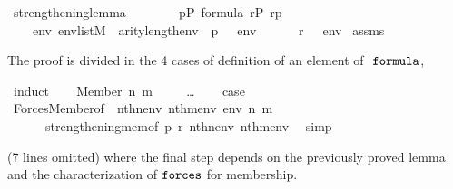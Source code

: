 \begin{isabelle}
\isamarkupfalse%
\ strengthening{\isacharunderscore}lemma{\isacharcolon}\isanewline
\ \ \ \isanewline
\ \ \ \ {\isachardoublequoteopen}p{\isasymin}P{\isachardoublequoteclose}\ {\isachardoublequoteopen}{\isasymphi}{\isasymin}formula{\isachardoublequoteclose}\ {\isachardoublequoteopen}r{\isasymin}P{\isachardoublequoteclose}\ {\isachardoublequoteopen}r{\isasympreceq}p{\isachardoublequoteclose}\isanewline
\ \ \isanewline
\ \ \ \ {\isachardoublequoteopen}{\isasymAnd}env{\isachardot}\ env{\isasymin}list{\isacharparenleft}M{\isacharparenright}\ {\isasymLongrightarrow}\ arity{\isacharparenleft}{\isasymphi}{\isacharparenright}{\isasymle}length{\isacharparenleft}env{\isacharparenright}\ {\isasymLongrightarrow}\ p\ {\isasymtturnstile}\ {\isasymphi}\ env\isanewline 
\ \ \ \ \ {\isasymLongrightarrow}\ r\ {\isasymtturnstile}\ {\isasymphi}\ env{\isachardoublequoteclose}\isanewline
%
%
\isamarkupfalse%
\ assms{\isacharparenleft}{}{\isacharparenright}
\end{isabelle}
%
The proof is divided in the 4 cases of definition of an element of $\formula$,
%
\begin{isabelle}
\isamarkupfalse%
\ {\isacharparenleft}induct{\isacharparenright}\isanewline
\ \ \isamarkupfalse%
\ {\isacharparenleft}Member\ n\ m{\isacharparenright}\isanewline
\ \ \isamarkupfalse%
\isanewline
\ \ \dots
\isanewline
\ \ \isamarkupfalse%
\ {\isacharquery}case\ \isanewline
\ \ \ \ \isamarkupfalse%
\ Forces{\isacharunderscore}Member{\isacharbrackleft}of\ {\isacharunderscore}\ {\isachardoublequoteopen}nth{\isacharparenleft}n{\isacharcomma}env{\isacharparenright}{\isachardoublequoteclose}\ {\isachardoublequoteopen}nth{\isacharparenleft}m{\isacharcomma}env{\isacharparenright}{\isachardoublequoteclose}\ env\ n\ m{\isacharbrackright}\isanewline
\ \ \ \ \ \ strengthening{\isacharunderscore}mem{\isacharbrackleft}of\ p\ r\ {\isachardoublequoteopen}nth{\isacharparenleft}n{\isacharcomma}env{\isacharparenright}{\isachardoublequoteclose}\ {\isachardoublequoteopen}nth{\isacharparenleft}m{\isacharcomma}env{\isacharparenright}{\isachardoublequoteclose}{\isacharbrackright}\ \isamarkupfalse%
\ simp
\end{isabelle}
%
(7 lines omitted) where the final step depends on the previously
proved lemma
 and the characterization of
$\mathop{\mathtt{forces}}$ for membership.



